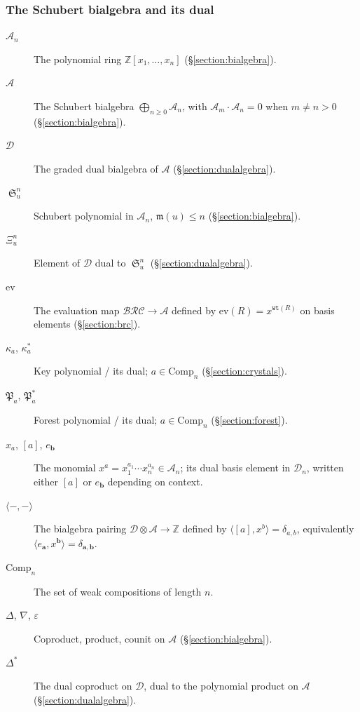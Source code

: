 \documentclass[a4paper,fleqn]{cas-sc}
\theoremstyle{definition}
\theoremstyle{remark}
\numberwithin{equation}{subsection}
\DeclareMathOperator{\sch}{\mathfrak{S}}
\newcommand{\wtt}{\mathtt{wt}}
\newcommand{\BRC}{\mathcal{BRC}}
\newcommand{\dsch}{\ensuremath{\Xi}}
\newcommand{\coma}{\mathcal{A}}
\newcommand{\dcoma}{\mathcal{D}}
\newcommand{\forest}{\mathfrak{P}}
\newcommand{\maxd}{\mathfrak{m}}
\begin{document}
\subsubsection*{The Schubert bialgebra and its dual}
\begin{description}
\item[$\coma_n$] The polynomial ring $\mathbb{Z}[x_1,\ldots,x_n]$ (\S\ref{section:bialgebra}).
\item[$\coma$] The Schubert bialgebra $\bigoplus_{n\geq 0}\coma_n$, with $\coma_m\cdot\coma_n=0$ when $m\neq n>0$ (\S\ref{section:bialgebra}).
\item[$\dcoma$] The graded dual bialgebra of $\coma$ (\S\ref{section:dualalgebra}).
\item[$\sch_u^n$] Schubert polynomial in $\coma_n$, $\maxd(u)\leq n$ (\S\ref{section:bialgebra}).
\item[$\dsch_u^n$] Element of $\dcoma$ dual to $\sch_u^n$ (\S\ref{section:dualalgebra}).
\item[$\mathrm{ev}$] The evaluation map $\BRC\to\coma$ defined by $\mathrm{ev}(R)=x^{\wtt(R)}$ on basis elements (\S\ref{section:brc}).
\item[$\kappa_a$, $\kappa_a^*$] Key polynomial / its dual; $a\in\mathrm{Comp}_n$ (\S\ref{section:crystals}).
\item[$\forest_a$, $\forest_a^*$] Forest polynomial / its dual; $a\in\mathrm{Comp}_n$ (\S\ref{section:forest}).
\item[{$x_a$, $[a]$, $e_{\mathbf b}$}] The monomial $x^{a}=x_1^{a_1}\cdots x_n^{a_n}\in\coma_n$; its dual basis element in $\dcoma_n$, written either $[a]$ or $e_{\mathbf b}$ depending on context.
\item[$\langle -,-\rangle$] The bialgebra pairing $\dcoma\otimes\coma\to\mathbb{Z}$ defined by $\langle [a],x^{b}\rangle=\delta_{a,b}$, equivalently $\langle e_{\mathbf a},x^{\mathbf b}\rangle=\delta_{\mathbf a,\mathbf b}$.
\item[$\mathrm{Comp}_n$] The set of weak compositions of length $n$.
\item[$\Delta$, $\nabla$, $\varepsilon$] Coproduct, product, counit on $\coma$ (\S\ref{section:bialgebra}).
\item[$\Delta^*$] The dual coproduct on $\dcoma$, dual to the polynomial product on $\coma$ (\S\ref{section:dualalgebra}).
\end{description}
\end{document}
